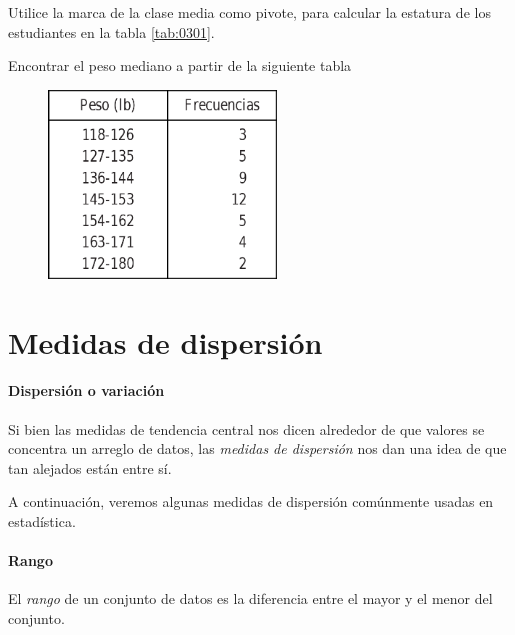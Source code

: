  

 
  \begin{problema}
   \label{problema:3.20}
   Utilice la marca de la clase media como pivote, para calcular la estatura de los estudiantes en la tabla \ref{tab:0301}.
  \end{problema}

 
 
  \begin{problema}
   \label{problema:3.28}
   Encontrar el peso mediano a partir de la siguiente tabla
   \begin{figure}[ht]
  \centering
  \includegraphics[height=5cm,keepaspectratio=true]{./images/tab0307.png}
  \label{tab:0307}
 \end{figure}

  \end{problema}

 

\section{Medidas de dispersión}

\paragraph{Dispersión o variación}
 Si bien las medidas de tendencia central nos dicen alrededor de que valores se concentra un arreglo de datos, las \emph{medidas de dispersión} nos dan una idea de que tan alejados están entre sí.

 



 A continuación, veremos algunas medidas de dispersión comúnmente usadas en estadística.

\paragraph{Rango}
El \emph{rango}
 de un conjunto de datos es la diferencia entre el mayor y el menor del conjunto.



